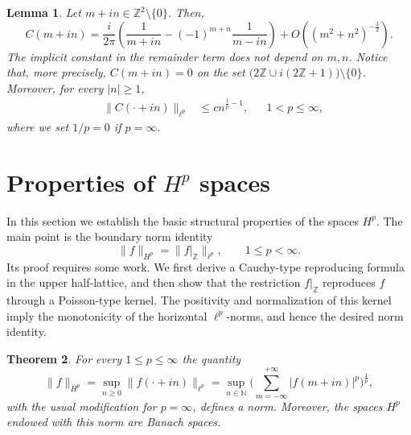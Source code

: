 \documentclass[12pt,a4paper,reqno]{amsart}
\newtheorem{thm}{Theorem}[section]
\newtheorem{lem}[thm]{Lemma}
\theoremstyle{definition}
\theoremstyle{definition}\newtheorem{defn}[thm]{Definition}
\begin{document}
    \begin{lem}\label{l:kernel_asymptotic}
    Let $m+in\in\mathbb Z^2\setminus\{0\}$. Then,
    \begin{equation}
    \label{eq:asymptotic}
    C(m+in)=
    \frac{i}{2\pi}\left(
    \frac{1}{m+in}
    -
    (-1)^{m+n}\frac{1}{m-in}
    \right)
    +O\!\left((m^2+n^2)^{-\frac32}\right).
    \end{equation}
    The implicit constant in the remainder term does not depend on $m,n$. Notice that, more precisely, \(
    C(m+in)=0
    \)
    on the set $\big(2\mathbb Z \cup i(2\mathbb Z+1)\big)\setminus\{0\}$.
    Moreover, for every $|n|\geqslant 1$,
    \begin{equation}
    \label{eq:K_norm_p}
    \begin{aligned}
    &\|C(\cdot+in)\|_{\ell^p}
    &\leqslant cn^{\frac1p-1},
    && 1<p\leqslant\infty,
    \end{aligned}
    \end{equation}
    where we set $1/p=0$ if $p=\infty$.
    \end{lem}
    
    
    
    
    
    
    
    
    \section{Properties of  $H^p$ spaces}\label{s:Hp}
    In this section we establish the basic structural properties of the spaces
    $H^p$. The main point is the boundary norm identity
    \[
    \|f\|_{H^p}
    =
    \|f|_{\mathbb Z}\|_{\ell^p},
    \qquad 1\leqslant p<\infty.
    \]
    Its proof requires some work. We first derive a Cauchy-type reproducing formula
    in the upper half-lattice, and then show that the restriction 
    $f|_{\mathbb Z}$ reproduces $f$ through a Poisson-type kernel. The positivity and normalization of this
    kernel imply the monotonicity of the horizontal $\ell^p$-norms, and hence the
    desired norm identity.
    \begin{thm}
    For every $1\leqslant p\leqslant\infty$ the quantity
    \[
    \|f\|_{H^p}=\sup_{n\geqslant 0}\|f(\cdot+in)\|_{\ell^p}=\sup_{n\in\mathbb N} \Big(\sum_{m=-\infty}^{+\infty}|f(m+in)|^p\Big)^{\frac1p},
    \]
    with the usual modification for $p=\infty$,
    defines a norm. Moreover, the spaces $H^p$ endowed with this norm are Banach spaces.
     
    \end{thm}
    
\end{document}
